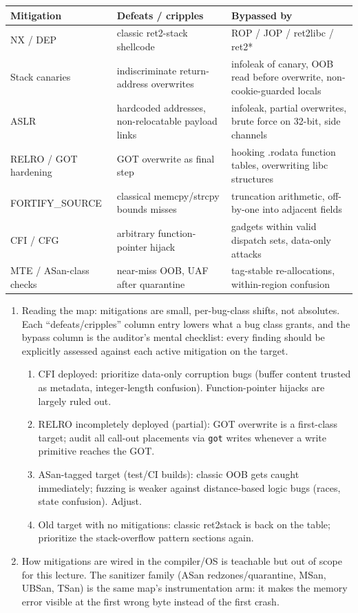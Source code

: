 \documentclass[12pt]{Training}
\begin{document}
\begin{center}
\footnotesize
\begin{tabular}{@{}p{3.4cm}|p{4.4cm}|p{7.4cm}@{}}
\toprule
\textbf{Mitigation} & \textbf{Defeats / cripples} & \textbf{Bypassed by} \\
\midrule
NX / DEP & classic ret2-stack shellcode & ROP / JOP / ret2libc / ret2* \\
Stack canaries & indiscriminate return-address overwrites & infoleak of canary, OOB read before overwrite, non-cookie-guarded locals \\
ASLR & hardcoded addresses, non-relocatable payload links & infoleak, partial overwrites, brute force on 32-bit, side channels \\
RELRO / GOT hardening & GOT overwrite as final step & hooking .rodata function tables, overwriting libc structures \\
FORTIFY\_SOURCE & classical memcpy/strcpy bounds misses & truncation arithmetic, off-by-one into adjacent fields \\
CFI / CFG & arbitrary function-pointer hijack & gadgets within valid dispatch sets, data-only attacks \\
MTE / ASan-class checks & near-miss OOB, UAF after quarantine & tag-stable re-allocations, within-region confusion \\
\bottomrule
\end{tabular}
\end{center}

\begin{enumerate}
    \item Reading the map: mitigations are small, per-bug-class shifts, not absolutes. Each ``defeats/cripples'' column entry lowers what a bug class grants, and the bypass column is the auditor's mental checklist: every finding should be explicitly assessed against each active mitigation on the target.
    \begin{enumerate}
        \item CFI deployed: prioritize data-only corruption bugs (buffer content trusted as metadata, integer-length confusion). Function-pointer hijacks are largely ruled out.
        \item RELRO incompletely deployed (partial): GOT overwrite is a first-class target; audit all call-out placements via \lstinline{got} writes whenever a write primitive reaches the GOT.
        \item ASan-tagged target (test/CI builds): classic OOB gets caught immediately; fuzzing is weaker against distance-based logic bugs (races, state confusion). Adjust.
        \item Old target with no mitigations: classic ret2stack is back on the table; prioritize the stack-overflow pattern sections again.
    \end{enumerate}
    \item How mitigations are wired in the compiler/OS is teachable but out of scope for this lecture. The sanitizer family (ASan redzones/quarantine, MSan, UBSan, TSan) is the same map's instrumentation arm: it makes the memory error visible at the first wrong byte instead of the first crash.
\end{enumerate}
\end{document}
